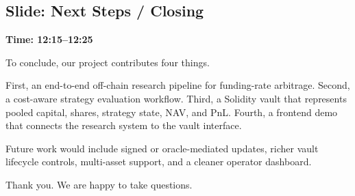 \documentclass[11pt]{article}
\begin{document}
\subsection*{Slide: Next Steps / Closing}
\textbf{Time: 12:15--12:25}

To conclude, our project contributes four things.

First, an end-to-end off-chain research pipeline for funding-rate arbitrage. Second, a cost-aware strategy evaluation workflow. Third, a Solidity vault that represents pooled capital, shares, strategy state, NAV, and PnL. Fourth, a frontend demo that connects the research system to the vault interface.

Future work would include signed or oracle-mediated updates, richer vault lifecycle controls, multi-asset support, and a cleaner operator dashboard.

Thank you. We are happy to take questions.
\end{document}
